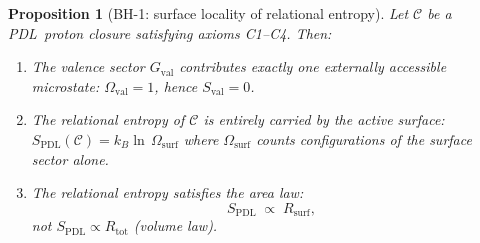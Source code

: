 \documentclass[11pt,a4paper]{article}
\theoremstyle{plain}
\newtheorem{proposition}[theorem]{Proposition}
\theoremstyle{definition}
\theoremstyle{remark}
\newcommand{\PDL}{\textsc{PDL}}
\newcommand{\Rtot}{R_{\mathrm{tot}}}
\newcommand{\Rsurf}{R_{\mathrm{surf}}}
\newcommand{\Gval}{G_{\mathrm{val}}}
\newcommand{\SPDL}{S_{\mathrm{PDL}}}
\begin{document}
\begin{proposition}[BH-1: surface locality of relational entropy]
\label{prop:bh1}
Let $\mathcal{C}$ be a \PDL\ proton closure satisfying axioms C1--C4. Then:
\begin{enumerate}[label=(\roman*)]
  \item The valence sector $\Gval$ contributes exactly one externally accessible
        microstate: $\Omega_{\mathrm{val}} = 1$, hence $S_{\mathrm{val}} = 0$.
  \item The relational entropy of $\mathcal{C}$ is entirely carried by the active
        surface: $\SPDL(\mathcal{C}) = k_B\ln\,\Omega_{\mathrm{surf}}$ where
        $\Omega_{\mathrm{surf}}$ counts configurations of the surface sector alone.
  \item The relational entropy satisfies the area law:
        \begin{equation}
          \SPDL \;\propto\; \Rsurf, \label{eq:area_law}
        \end{equation}
        not $\SPDL \propto \Rtot$ (volume law).
\end{enumerate}
\end{proposition}
\end{document}
